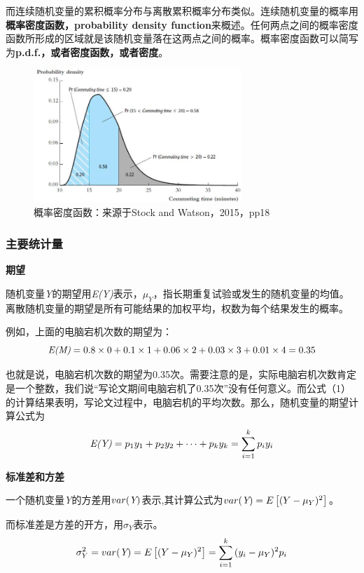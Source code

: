 \documentclass[cn,12pt,math=newtx,citestyle=gb7714-2015,bibstyle=gb7714-2015]{elegantbook}
\begin{document}
	而连续随机变量的累积概率分布与离散累积概率分布类似。连续随机变量的概率用\textbf{概率密度函数，probability density function}来概述。任何两点之间的概率密度函数所形成的区域就是该随机变量落在这两点之间的概率。概率密度函数可以简写为\textbf{p.d.f.，或者密度函数，或者密度}。
	\begin{figure}[htbp]
		\centering
		\includegraphics[width=0.7\textwidth]{pdf.jpg}
		\caption{概率密度函数：来源于Stock and Watson，2015，pp18}\label{fig:digit}
	\end{figure}
	
	\subsubsection{主要统计量}
	\textbf{期望}
	
	随机变量\emph{Y}的期望用\emph{E(Y)}表示，$\mu_{Y}$，指长期重复试验或发生的随机变量的均值。离散随机变量的期望是所有可能结果的加权平均，权数为每个结果发生的概率。
	
	例如，上面的电脑宕机次数的期望为：
	\begin{equation}
		\emph{E(M)}=0.8\times0+0.1\times1+0.06\times2+0.03\times3+0.01\times4=0.35
	\end{equation}
	
	也就是说，电脑宕机次数的期望为0.35次。需要注意的是，实际电脑宕机次数肯定是一个整数，我们说“写论文期间电脑宕机了0.35次”没有任何意义。而公式（1）的计算结果表明，写论文过程中，电脑宕机的平均次数。那么，随机变量的期望计算公式为
	\begin{equation}
		\emph{E(Y)}=p_1y_1+p_2y_2+\cdots+p_ky_k=\sum_{i=1}^{k}{p_iy_i}
	\end{equation}
	
	\textbf{标准差和方差}
	
	一个随机变量\emph{Y}的方差用$var(\emph{Y})$表示,其计算公式为$var(\emph{Y})=E\left[(Y-\mu_{Y})^2\right]$。
	
	而标准差是方差的开方，用$\sigma_{Y}$表示。
	\begin{equation}
		\sigma_{Y}^2=var(\emph{Y})=E\left[(Y-\mu_{Y})^2\right]=\sum_{i=1}^{k}{(y_i-\mu_{Y})^2p_i}
	\end{equation}
	
\end{document}

